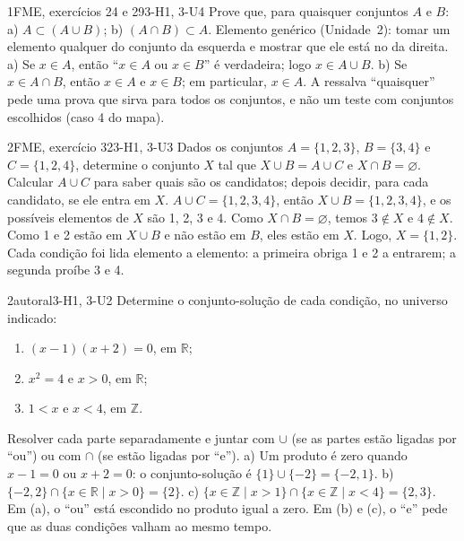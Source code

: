 \begin{exemplo}{}{1}{FME, exercícios 24 e 29}{3-H1, 3-U4}
\label{ex:u3:inclusoes}
Prove que, para quaisquer conjuntos $A$ e $B$: a) $A\subset(A\cup B)$; b) $(A\cap B)\subset A$.
\plano Elemento genérico (Unidade~2): tomar um elemento qualquer do conjunto da esquerda e mostrar que ele está no da direita.
\resolucao a) Se $x\in A$, então \enquote{$x\in A$ ou $x\in B$} é verdadeira; logo $x\in A\cup B$. b) Se $x\in A\cap B$, então $x\in A$ e $x\in B$; em particular, $x\in A$.
\comentario A ressalva \enquote{quaisquer} pede uma prova que sirva para todos os conjuntos, e não um teste com conjuntos escolhidos (caso 4 do mapa).
\end{exemplo}

\begin{exemplo}{}{2}{FME, exercício 32}{3-H1, 3-U3}
\label{ex:u3:fme32}
Dados os conjuntos $A=\{1,2,3\}$, $B=\{3,4\}$ e $C=\{1,2,4\}$, determine o conjunto $X$ tal que $X\cup B=A\cup C$ e $X\cap B=\varnothing$.
\plano Calcular $A\cup C$ para saber quais são os candidatos; depois decidir, para cada candidato, se ele entra em $X$.
\resolucao $A\cup C=\{1,2,3,4\}$, então $X\cup B=\{1,2,3,4\}$, e os possíveis elementos de $X$ são 1, 2, 3 e 4. Como $X\cap B=\varnothing$, temos $3\notin X$ e $4\notin X$. Como 1 e 2 estão em $X\cup B$ e não estão em $B$, eles estão em $X$. Logo, $X=\{1,2\}$.
\comentario Cada condição foi lida elemento a elemento: a primeira obriga 1 e 2 a entrarem; a segunda proíbe 3 e 4.
\end{exemplo}

\begin{exemplo}{}{2}{autoral}{3-H1, 3-U2}
\label{ex:u3:solucoes}
Determine o conjunto-solução de cada condição, no universo indicado:
\begin{enumerate}[label=\alph*)]
  \item $(x-1)(x+2)=0$, em $\mathbb{R}$;
  \item $x^2=4$ e $x>0$, em $\mathbb{R}$;
  \item $1<x$ e $x<4$, em $\mathbb{Z}$.
\end{enumerate}
\plano Resolver cada parte separadamente e juntar com $\cup$ (se as partes estão ligadas por \enquote{ou}) ou com $\cap$ (se estão ligadas por \enquote{e}).
\resolucao a) Um produto é zero quando $x-1=0$ ou $x+2=0$: o conjunto-solução é $\{1\}\cup\{-2\}=\{-2,1\}$. b) $\{-2,2\}\cap\{x\in\mathbb{R}\mid x>0\}=\{2\}$. c) $\{x\in\mathbb{Z}\mid x>1\}\cap\{x\in\mathbb{Z}\mid x<4\}=\{2,3\}$.
\comentario Em (a), o \enquote{ou} está escondido no produto igual a zero. Em (b) e (c), o \enquote{e} pede que as duas condições valham ao mesmo tempo.
\end{exemplo}

